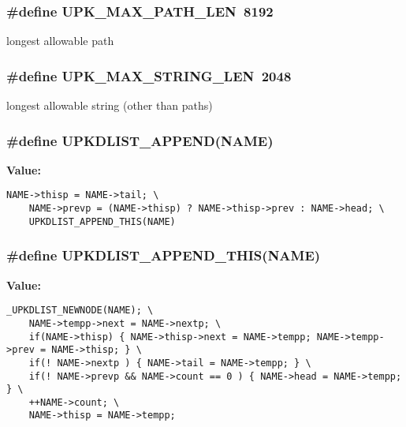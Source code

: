 \subsubsection{\setlength{\rightskip}{0pt plus 5cm}\#define UPK\_\-MAX\_\-PATH\_\-LEN~8192}\label{types_8h_863b8cd9ca2b9f6e3cd25da0f16958b9}


longest allowable path 
\subsubsection{\setlength{\rightskip}{0pt plus 5cm}\#define UPK\_\-MAX\_\-STRING\_\-LEN~2048}\label{types_8h_a2d52d874e5048aefdd746d8e496c6ef}


longest allowable string (other than paths) 
\subsubsection{\setlength{\rightskip}{0pt plus 5cm}\#define UPKDLIST\_\-APPEND(NAME)}\label{types_8h_463789903b5dc453c225be400f6736f9}


\textbf{Value:}

\begin{Code}\begin{verbatim}NAME->thisp = NAME->tail; \
    NAME->prevp = (NAME->thisp) ? NAME->thisp->prev : NAME->head; \
    UPKDLIST_APPEND_THIS(NAME)
\end{verbatim}\end{Code}
\subsubsection{\setlength{\rightskip}{0pt plus 5cm}\#define UPKDLIST\_\-APPEND\_\-THIS(NAME)}\label{types_8h_b955e4a93d33d4a333b628531043bb0d}


\textbf{Value:}

\begin{Code}\begin{verbatim}_UPKDLIST_NEWNODE(NAME); \
    NAME->tempp->next = NAME->nextp; \
    if(NAME->thisp) { NAME->thisp->next = NAME->tempp; NAME->tempp->prev = NAME->thisp; } \
    if(! NAME->nextp ) { NAME->tail = NAME->tempp; } \
    if(! NAME->prevp && NAME->count == 0 ) { NAME->head = NAME->tempp; } \
    ++NAME->count; \
    NAME->thisp = NAME->tempp;
\end{verbatim}\end{Code}
